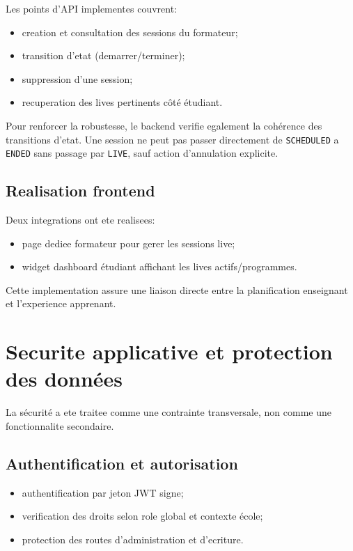 \documentclass[12pt,a4paper,oneside]{report}
\begin{document}
Les points d'API implementes couvrent:
\begin{itemize}
  \item creation et consultation des sessions du formateur;
  \item transition d'etat (demarrer/terminer);
  \item suppression d'une session;
  \item recuperation des lives pertinents côté étudiant.
\end{itemize}

Pour renforcer la robustesse, le backend verifie egalement la cohérence des transitions d'etat. Une session ne peut pas passer directement de \texttt{SCHEDULED} a \texttt{ENDED} sans passage par \texttt{LIVE}, sauf action d'annulation explicite.

\subsection{Realisation frontend}

Deux integrations ont ete realisees:
\begin{itemize}
  \item page dediee formateur pour gerer les sessions live;
  \item widget dashboard étudiant affichant les lives actifs/programmes.
\end{itemize}

Cette implementation assure une liaison directe entre la planification enseignant et l'experience apprenant.

\section{Securite applicative et protection des données}

La sécurité a ete traitee comme une contrainte transversale, non comme une fonctionnalite secondaire.

\subsection{Authentification et autorisation}

\begin{itemize}
  \item authentification par jeton JWT signe;
  \item verification des droits selon role global et contexte école;
  \item protection des routes d'administration et d'ecriture.
\end{itemize}
\end{document}
